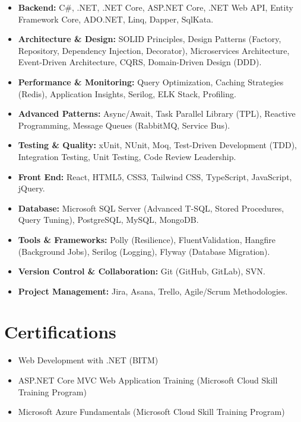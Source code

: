 \documentclass[a4paper,10pt]{article}
\begin{document}
\begin{itemize}
  \item \textbf{Backend:} C\#, .NET, .NET Core, ASP.NET Core, .NET Web API, Entity Framework Core, ADO.NET, Linq, Dapper, SqlKata.
  \item \textbf{Architecture \& Design:} SOLID Principles, Design Patterns (Factory, Repository, Dependency Injection, Decorator), Microservices Architecture, Event-Driven Architecture, CQRS, Domain-Driven Design (DDD).
  \item \textbf{Performance \& Monitoring:} Query Optimization, Caching Strategies (Redis), Application Insights, Serilog, ELK Stack, Profiling.
  \item \textbf{Advanced Patterns:} Async/Await, Task Parallel Library (TPL), Reactive Programming, Message Queues (RabbitMQ, Service Bus).
  \item \textbf{Testing \& Quality:} xUnit, NUnit, Moq, Test-Driven Development (TDD), Integration Testing, Unit Testing, Code Review Leadership.
  \item \textbf{Front End:} React, HTML5, CSS3, Tailwind CSS, TypeScript, JavaScript, jQuery.
  \item \textbf{Database:} Microsoft SQL Server (Advanced T-SQL, Stored Procedures, Query Tuning), PostgreSQL, MySQL, MongoDB.
  \item \textbf{Tools \& Frameworks:} Polly (Resilience), FluentValidation, Hangfire (Background Jobs), Serilog (Logging), Flyway (Database Migration).
  \item \textbf{Version Control \& Collaboration:} Git (GitHub, GitLab), SVN.
  \item \textbf{Project Management:} Jira, Asana, Trello, Agile/Scrum Methodologies.
\end{itemize}

\section{Certifications}

\begin{itemize}
  \item Web Development with .NET (BITM)
  \item ASP.NET Core MVC Web Application Training (Microsoft Cloud Skill Training Program)
  \item Microsoft Azure Fundamentals (Microsoft Cloud Skill Training Program)
\end{itemize}
\end{document}
